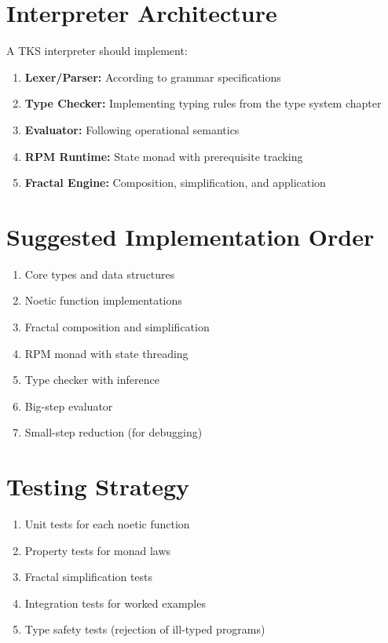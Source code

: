 \documentclass[11pt,twoside,openright]{book}
\theoremstyle{definition}
\theoremstyle{plain}
\theoremstyle{remark}
\begin{document}
\section{Interpreter Architecture}

A TKS interpreter should implement:

\begin{enumerate}
\item \textbf{Lexer/Parser:} According to grammar specifications
\item \textbf{Type Checker:} Implementing typing rules from the type system chapter
\item \textbf{Evaluator:} Following operational semantics
\item \textbf{RPM Runtime:} State monad with prerequisite tracking
\item \textbf{Fractal Engine:} Composition, simplification, and application
\end{enumerate}

\section{Suggested Implementation Order}

\begin{enumerate}
\item Core types and data structures
\item Noetic function implementations
\item Fractal composition and simplification
\item RPM monad with state threading
\item Type checker with inference
\item Big-step evaluator
\item Small-step reduction (for debugging)
\end{enumerate}

\section{Testing Strategy}

\begin{enumerate}
\item Unit tests for each noetic function
\item Property tests for monad laws
\item Fractal simplification tests
\item Integration tests for worked examples
\item Type safety tests (rejection of ill-typed programs)
\end{enumerate}
\end{document}
